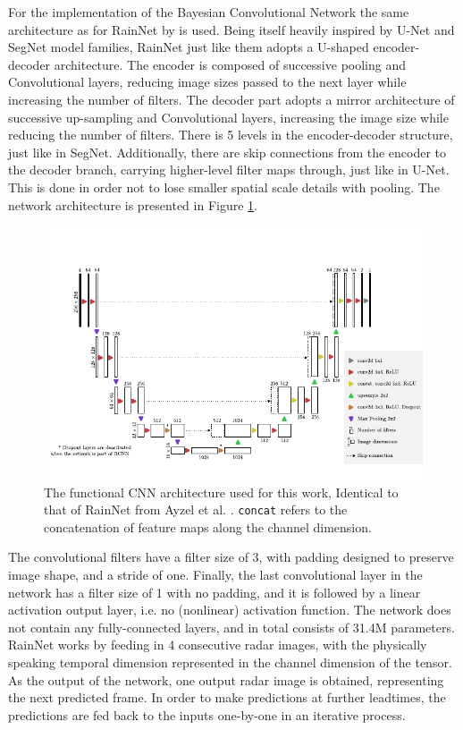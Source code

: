 For the implementation of the Bayesian Convolutional Network the same architecture as for RainNet by \citet{ayzel_rainnet_nodate} is used. Being itself heavily inspired by U-Net and SegNet model families, RainNet just like them adopts a U-shaped encoder-decoder architecture. The encoder is composed of successive pooling and Convolutional layers, reducing image sizes passed to the next layer while increasing the number of filters. The decoder part adopts a mirror architecture of successive up-sampling and Convolutional layers, increasing the image size while reducing the number of filters. There is 5 levels in the encoder-decoder structure, just like in SegNet. Additionally, there are skip connections from the encoder to the decoder branch, carrying higher-level filter maps through, just like in U-Net. This is done in order not to lose smaller spatial scale details with pooling. The network architecture is presented in Figure \ref{fig:rainnet}.

\begin{figure}[h]
	\centering
	\includegraphics[scale=1]{images/rainnet_arch/rainnet_arch}
	\caption{The functional CNN architecture used for this work, Identical to that of RainNet from Ayzel et al. \cite{ayzel_rainnet_nodate}. \texttt{concat} refers to the concatenation of feature maps along the channel dimension.}
	\label{fig:rainnet}
\end{figure}

The convolutional filters have a filter size of 3, with padding designed to preserve image shape, and a stride of one. Finally, the last convolutional layer in the network has a filter size of 1 with no padding, and it is followed by a linear activation output layer, i.e. no (nonlinear) activation function. The network does not contain any fully-connected layers, and in total consists of 31.4M parameters. RainNet works by feeding in 4 consecutive radar images, with the physically speaking temporal dimension represented in the channel dimension of the tensor. As the output of the network, one output radar image is obtained, representing the next predicted frame. In order to make predictions at further leadtimes, the predictions are fed back to the inputs one-by-one in an iterative process. 

